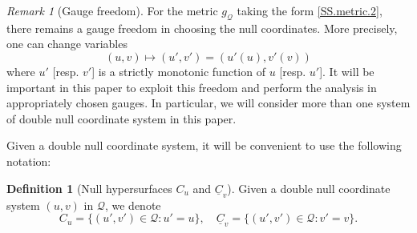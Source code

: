 \documentclass[10pt, reqno]{amsart}
\theoremstyle{definition}
\newtheorem{definition}[theorem]{Definition}
\theoremstyle{remark}
\newtheorem{remark}[theorem]{Remark}
\theoremstyle{conjecture}
\numberwithin{equation}{section}
\newcommand{\0}{\emptyset}
\newcommand{\calQ}{\mathcal Q}
\newcommand{\uC}{\underline{C}}
\begin{document}
\begin{remark}[Gauge freedom]
For the metric $g_{\mathcal Q}$ taking the form \eqref{SS.metric.2}, there remains a gauge freedom in choosing the null coordinates. More precisely, one can change variables
\begin{equation*}
	(u, v) \mapsto (u', v') = (u'(u), v'(v))
\end{equation*}
where $u'$ [resp. $v'$] is a strictly monotonic function of $u$ [resp. $u'$]. It will be important in this paper to exploit this freedom and perform the analysis in appropriately chosen gauges. In particular, we will consider more than one system of double null coordinate system in this paper. 
\end{remark}

Given a double null coordinate system, it will be convenient to use the following notation:
\begin{definition}[Null hypersurfaces $C_u$ and $\uC_v$]\label{def:C.uC}
Given a double null coordinate system $(u,v)$ in $\calQ$, we denote
$$C_u=\{(u',v')\in \calQ: u'=u \},\quad \uC_v=\{(u',v')\in \calQ: v'=v \}.$$
\end{definition}
\end{document}
